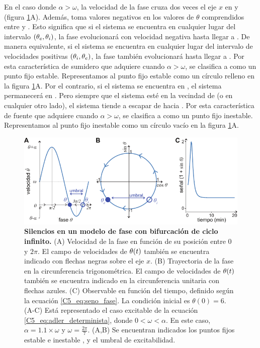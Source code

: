 \documentclass[./main.tex]{subfiles}
\begin{document}
En el caso donde $\alpha > \omega$, la velocidad de la fase cruza dos veces el eje $x$ en \xxe y \xxi (figura \ref{C5_fig:adler_determinista_excitable}A). Además, toma valores negativos en los valores de $\theta$ comprendidos entre \xxe y \xxi. Esto significa que si el sistema se encuentra en cualquier lugar del intervalo $(\theta_e,\theta_i)$, la fase evolucionará con velocidad negativa hasta llegar a \xxe. De manera equivalente, si el sistema se encuentra en cualquier lugar del intervalo de velocidades positivas $(\theta_i,\theta_e)$, la fase también evolucionará hasta llegar a \xxe. Por esta característica de sumidero que adquiere \xxe cuando $\alpha > \omega$, se clasifica a \xxe como un punto fijo estable. Representamos al punto fijo estable como un círculo relleno en la figura \ref{C5_fig:adler_determinista_excitable}A. Por el contrario, si el sistema se encuentra en \xxi, el sistema permanecerá en \xxi. Pero siempre que el sistema esté en la vecindad de \xxi (o en cualquier otro lado), el sistema tiende a escapar de \xxi hacia \xxe. Por esta característica de fuente que adquiere \xxi cuando $\alpha > \omega$, se clasifica a \xxi como un punto fijo inestable. Representamos al punto fijo inestable como un círculo vacío en la figura \ref{C5_fig:adler_determinista_excitable}A.


 \begin{figure}
    \centering
    \includegraphics[width=1\columnwidth]{figures/chapter5/C5_determinista_excitable.pdf} 
    \caption{\textbf{Silencios en un modelo de fase con bifurcación de ciclo infinito.} (A) Velocidad de la fase en función de su posición entre $0$ y $2\pi$. El campo de velocidades de $\theta(t)$ también se encuentra indicado con flechas negras sobre el eje $x$. (B) Trayectoria de la fase en la circunferencia trigonométrica. El campo de velocidades de $\theta(t)$ también se encuentra indicado en la circunferencia unitaria con flechas azules. (C) Observable en función del tiempo, definido según la ecuación \ref{C5_eq:seno_fase}. La condición inicial es $\theta(0) = 6$. (A-C) Está representado el caso excitable de la ecuación \ref{C5_eq:adler_determinista}, donde $ 0 < \omega < \alpha$. En este caso, $\alpha = 1.1 \times \omega$ y $\omega = \frac{2 \pi}{7}$. (A,B) Se encuentran indicados los puntos fijos estable \xxe e inestable \xxi, y el umbral de excitabilidad.}
    \label{C5_fig:adler_determinista_excitable}
\end{figure}
\end{document}
